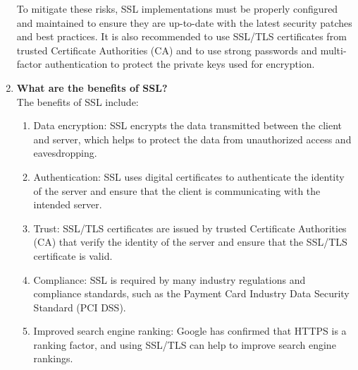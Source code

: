 \documentclass[11pt]{article}
\begin{document}
\begin{enumerate}
          To mitigate these risks, SSL implementations must be properly configured and maintained to ensure they are up-to-date with the latest security patches and best practices. It is also recommended to use SSL/TLS certificates from trusted Certificate Authorities (CA) and to use strong passwords and multi-factor authentication to protect the private keys used for encryption.

    \item \textbf{What are the benefits of SSL?}\\

          The benefits of SSL include:

          \begin{enumerate}
              \item Data encryption: SSL encrypts the data transmitted between the client and server, which helps to protect the data from unauthorized access and eavesdropping.
              \item Authentication: SSL uses digital certificates to authenticate the identity of the server and ensure that the client is communicating with the intended server.
              \item Trust: SSL/TLS certificates are issued by trusted Certificate Authorities (CA) that verify the identity of the server and ensure that the SSL/TLS certificate is valid.
              \item Compliance: SSL is required by many industry regulations and compliance standards, such as the Payment Card Industry Data Security Standard (PCI DSS).
              \item Improved search engine ranking: Google has confirmed that HTTPS is a ranking factor, and using SSL/TLS can help to improve search engine rankings.
          \end{enumerate}

\end{enumerate}
\end{document}
